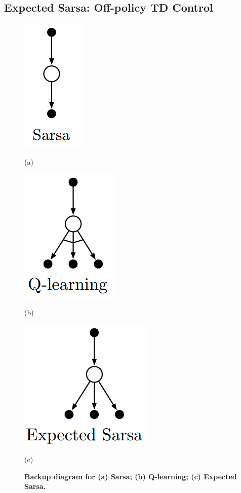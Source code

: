 \documentclass[11pt]{article}
\begin{document}
\subsection{Expected Sarsa: Off-policy TD Control}
\begin{figure}
\begin{minipage}[t]{0.3\linewidth}
  \centering
  \centerline{\includegraphics[scale = 0.3]{backup_diagram_sarsa.png}}
  \vspace{-7pt}
 \centerline{\footnotesize{(a) }}
\end{minipage}
\begin{minipage}[t]{0.3\linewidth}
  \centering
  \centerline{\includegraphics[scale = 0.3]{backup_diagram_q_learning.png}}
  \vspace{-7pt}
 \centerline{\footnotesize{(b) }}
\end{minipage}
\begin{minipage}[t]{0.3\linewidth}
  \centering
  \centerline{\includegraphics[scale = 0.3]{backup_diagram_exp_sarsa.png}}
  \vspace{-7pt}
 \centerline{\footnotesize{(c) }}
\end{minipage}
\caption{\footnotesize{\textbf{Backup diagram for (a) Sarsa; (b) Q-learning; (c) Expected Sarsa.}}}
\label{fig: backup_diagram_td_control}
\end{figure}
\end{document}
